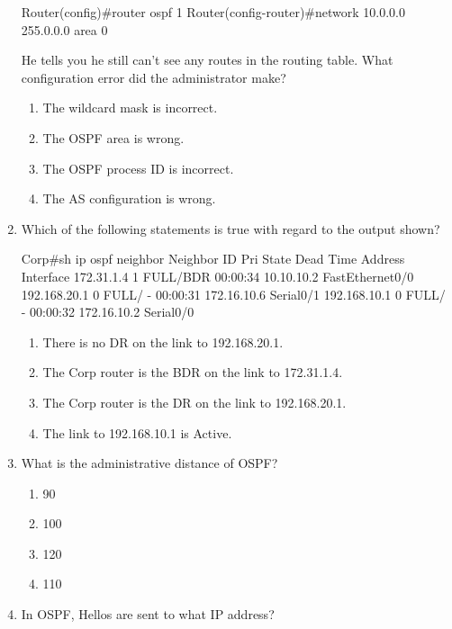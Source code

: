 \begin{enumerate}
\begin{cli}
Router(config)#router ospf 1
Router(config-router)#network 10.0.0.0 255.0.0.0 area 0
\end{cli}

  He tells you he still can't see any routes in the routing table. What
  configuration error did the administrator make?

  \begin{enumerate}
  \def\labelenumii{\Alph{enumii}.}
    \item
    The wildcard mask is incorrect.
  \item
    The OSPF area is wrong.
  \item
    \protect\hypertarget{c18.xhtmlux5cux23Page_778}{}{}The OSPF process
    ID is incorrect.
  \item
    The AS configuration is wrong.
  \end{enumerate}
\item
  Which of the following statements is true with regard to the output
  shown?

\begin{cli}
Corp#sh ip ospf neighbor
Neighbor ID     Pri   State      Dead Time   Address         Interface
172.31.1.4        1   FULL/BDR   00:00:34    10.10.10.2     FastEthernet0/0
192.168.20.1      0   FULL/  -   00:00:31    172.16.10.6     Serial0/1
192.168.10.1      0   FULL/  -   00:00:32    172.16.10.2     Serial0/0
\end{cli}

  \begin{enumerate}
  \def\labelenumii{\Alph{enumii}.}
    \item
    There is no DR on the link to 192.168.20.1.
  \item
    The Corp router is the BDR on the link to 172.31.1.4.
  \item
    The Corp router is the DR on the link to 192.168.20.1.
  \item
    The link to 192.168.10.1 is Active.
  \end{enumerate}
\item
  What is the administrative distance of OSPF?

  \begin{enumerate}
  \def\labelenumii{\Alph{enumii}.}
    \item
    90
  \item
    100
  \item
    120
  \item
    110
  \end{enumerate}
\item
  In OSPF, Hellos are sent to what IP address?


\end{enumerate}
